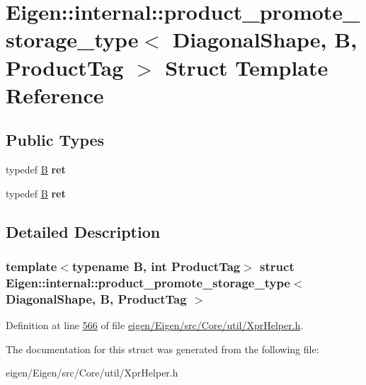 \hypertarget{struct_eigen_1_1internal_1_1product__promote__storage__type_3_01_diagonal_shape_00_01_b_00_01_product_tag_01_4}{}\section{Eigen\+:\+:internal\+:\+:product\+\_\+promote\+\_\+storage\+\_\+type$<$ Diagonal\+Shape, B, Product\+Tag $>$ Struct Template Reference}
\label{struct_eigen_1_1internal_1_1product__promote__storage__type_3_01_diagonal_shape_00_01_b_00_01_product_tag_01_4}
\subsection*{Public Types}
\begin{DoxyCompactItemize}
\item 
\mbox{\label{struct_eigen_1_1internal_1_1product__promote__storage__type_3_01_diagonal_shape_00_01_b_00_01_product_tag_01_4_a3f6b937aa24fb81d1e6febbd20e810d2}} 
typedef \hyperlink{group___core___module_class_eigen_1_1_matrix}{B} {\bfseries ret}
\item 
\mbox{\label{struct_eigen_1_1internal_1_1product__promote__storage__type_3_01_diagonal_shape_00_01_b_00_01_product_tag_01_4_a3f6b937aa24fb81d1e6febbd20e810d2}} 
typedef \hyperlink{group___core___module_class_eigen_1_1_matrix}{B} {\bfseries ret}
\end{DoxyCompactItemize}


\subsection{Detailed Description}
\subsubsection*{template$<$typename B, int Product\+Tag$>$\newline
struct Eigen\+::internal\+::product\+\_\+promote\+\_\+storage\+\_\+type$<$ Diagonal\+Shape, B, Product\+Tag $>$}



Definition at line \hyperlink{eigen_2_eigen_2src_2_core_2util_2_xpr_helper_8h_source_l00566}{566} of file \hyperlink{eigen_2_eigen_2src_2_core_2util_2_xpr_helper_8h_source}{eigen/\+Eigen/src/\+Core/util/\+Xpr\+Helper.\+h}.



The documentation for this struct was generated from the following file\+:\begin{DoxyCompactItemize}
\item 
eigen/\+Eigen/src/\+Core/util/\+Xpr\+Helper.\+h\end{DoxyCompactItemize}
